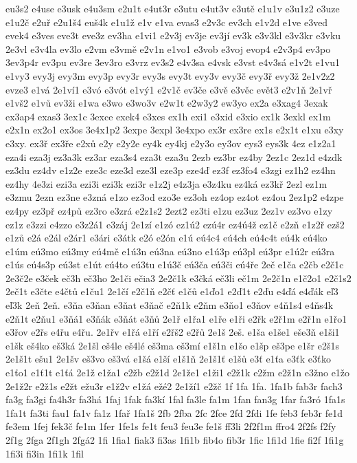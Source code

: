{eu3s2
e4use
e3usk
e4u3sm
e2u1t
e4ut3r
e3utu
e4ut3v
e3utě
e1u1v
e3u1z2
e3uze
e1u2č
e2uř
e2u1š4
euš4k
e1u1ž
e1v
e1va
evas3
e2v3c
ev3ch
e1v2d
e1ve
e3ved
evek4
e3ves
eve3t
eve3z
ev3ha
e1vi1
e2v3j
ev3je
ev3jí
ev3k
e3v3kl
e3v3kr
e3vku
2e3vl
e3v4la
ev3lo
e2vm
e3vmě
e2v1n
e1vo1
e3vob
e3voj
evop4
e2v3p4
ev3po
3ev3p4r
ev3pu
ev3re
3ev3ro
e3vrz
ev3s2
e4v3sa
e4vsk
e3vst
e4v3sá
e1v2t
e1vu1
e1vy3
evy3j
evy3m
evy3p
evy3r
evy3s
evy3t
evy3v
evy3č
evy3ř
evy3ž
2e1v2z2
evze3
e1vá
2e1ví1
e3vó
e3vót
e1vý1
e2v1č
ev3če
e3vě
e3věc
evět3
e2v1ň
2e1vř
e1vš2
e1vů
ev3ži
e1wa
e3wo
e3wo3v
e2w1t
e2w3y2
ew3yo
ex2a
e3xag4
3exak
ex3ap4
exas3
3ex1c
3exce
exek4
e3xes
ex1h
exi1
e3xid
e3xio
ex1k
3exkl
ex1m
e2x1n
ex2o1
ex3os
3e4x1p2
3expe
3expl
3e4xpo
ex3r
ex3re
ex1s
e2x1t
e1xu
e3xy
e3xy.
ex3ř
ex3ře
e2xů
e2y
e2y2e
ey4k
ey4kj
e2y3o
ey3ov
eys3
eys3k
4ez
e1z2a1
eza4i
eza3j
ez3a3k
ez3ar
eza3s4
eza3t
eza3u
2ezb
ez3br
ez4by
2ez1c
2ez1d
e4zdk
ez3du
ez4dv
e1z2e
eze3c
eze3d
eze3l
eze3p
eze4ď
ez3f
ez3fo4
e3zgi
ez1h2
ez4hn
ez4hy
4e3zi
ezi3a
ezi3i
ezi3k
ezi3r
e1z2j
e4z3ja
e3z4ku
ez4ká
ez3kř
2ezl
ez1m
e3zmu
2ezn
ez3ne
e3zná
e1zo
ez3od
ezo3e
ez3oh
ez4op
ez4ot
ez4ou
2ez1p2
e4zpe
ez4py
ez3př
ez4pů
ez3ro
e3zrá
e2z1s2
2ezt2
ez3ti
e1zu
ez3uz
2ez1v
ez3vo
e1zy
ez1z
e3zzi
e4zzo
e3z2á1
e3záj
2e1zí
e1zó
ez1ú2
ezú4r
ez4ú4ž
ez1č
e2zň
e1z2ř
ezš2
e1zů
e2á
e2ál
e2ár1
e3ári
e3átk
e2ó
e2ón
e1ú
eú4c4
eú4ch
eú4c4t
eú4k
eú4ko
e1úm
eú3mo
eú3my
eú4mě
e1ú3n
eú3na
eú3no
e1ú3p
eú3pl
eú3pr
e1ú2r
eú3ra
e1ús
eú4s3p
eú3st
e1út
eú4to
eú3tu
e1ú3č
eú3ča
eú3či
eú4ře
2eč
e1ča
e2čb
e2č1c
2e3č2e
e3ček
eč3h
eč3ho
2e1či
ečia3
2e2č1k
e3čká
eč3li
eč1m
2e2č1n
e1č2o1
e2č1s2
2eč1t
e3čte
e4čtů
e1ču1
2e1čí
e2č1ň
e2čť
e1čů
e1ďo1
e2ď1t
e2ďu
e4ďá
e4ďák
eľ3
eľ3k
2eň
2eň.
e3ňa
e3ňan
e3ňat
e3ňač
e2ň1k
e2ňm
e3ňo1
e3ňov
e4ň1s4
e4ňs4k
e2ň1t
e2ňu1
e3ňá1
e3ňák
e3ňát
e3ňů
2e1ř
e1řa1
e1ře
e1ři
e2řk
e2ř1m
e2ř1n
e1řo1
e3řov
e2řs
e4řu
e4řu.
2e1řv
e1řá
e1ří
e2řš2
e2řů
2e1š
2eš.
e1ša
e1še1
eše3ň
e1ši1
e1šk
eš4ko
eš3ká
2e1šl
eš4le
eš4lé
eš3ma
eš3mí
e1š1n
e1šo
e1šp
eš3pe
e1šr
e2š1s
2e1š1t
ešu1
2e1šv
eš3vo
eš3vá
e1šá
e1ší
e1š1ň
2e1š1ť
e1šů
e3ť
e1ťa
e3ťk
e3ťko
e1ťo1
e1ť1t
e1ťá
2e1ž
e1ža1
e2žb
e2ž1d
2e1že1
e1ži1
e2ž1k
e2žm
e2ž1n
e3žno
e1žo
2e1ž2r
e2ž1s
e2žt
ežu3r
e1ž2v
e1žá
ežé2
2e1ží1
e2žč
1f
1fa
1fa.
1fa1b
fab3r
fach3
fa3g
fa3gi
fa4h3r
fa3há
1faj
1fak
fa3kí
1fal
fa3le
fa1m
1fan
fan3g
1far
fa3ró
1fa1s
1fa1t
fa3ti
fau1
fa1v
fa1z
1fař
1fa1š
2fb
2fba
2fc
2fce
2fd
2fdi
1fe
feb3
feb3r
fe1d
fe3em
1fej
fek3č
fe1m
1fer
1fe1s
fe1t
feu3
feu3e
fe1š
ff3li
2f2f1m
ffro4
2f2fs
f2fy
2f1g
2fga
2f1gh
2fgá2
1fi
1fia1
fiak3
fi3as
1fi1b
fib4o
fib3r
1fic
1fi1d
1fie
fi2f
1fi1g
1fi3i
fi3in
1fi1k
1fil
}
